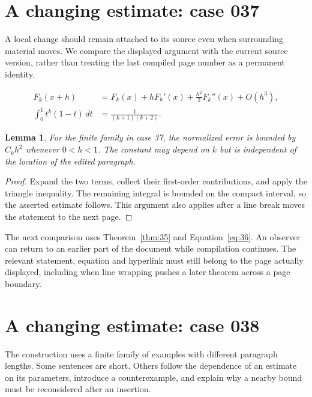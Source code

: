\documentclass[a4paper,10pt]{article}
\newtheorem{lemma}[theorem]{Lemma}
\begin{document}
\lipsum[3]

\section{A changing estimate: case 037}\label{unit:36}
A local change should remain attached to its source even when surrounding material moves. We compare the displayed argument with the current source version, rather than treating the last compiled page number as a permanent identity.

\lipsum[19-20]
\begin{align}\label{eq:36}
 F_k(x+h)&=F_k(x)+hF_k'(x)+\frac{h^2}{2}F_k''(x)+O(h^3),\\
 \int_0^1 t^k(1-t)\,dt&=\frac{1}{(k+1)(k+2)}.
\end{align}
\begin{lemma}\label{thm:36}
For the finite family in case 37, the normalized error is bounded by $C_k h^2$ whenever $0<h<1$. The constant may depend on $k$ but is independent of the location of the edited paragraph.
\end{lemma}
\begin{proof}
Expand the two terms, collect their first-order contributions, and apply the
triangle inequality. The remaining integral is bounded on the compact interval,
so the asserted estimate follows. This argument also applies after a line break
moves the statement to the next page.
\end{proof}
The next comparison uses Theorem~\ref{thm:35} and Equation~\ref{eq:36}. An observer can return to an earlier part of the document while compilation continues. The relevant statement, equation and hyperlink must still belong to the page actually displayed, including when line wrapping pushes a later theorem across a page boundary.

\lipsum[8]

\section{A changing estimate: case 038}\label{unit:37}
The construction uses a finite family of examples with different paragraph lengths. Some sentences are short. Others follow the dependence of an estimate on its parameters, introduce a counterexample, and explain why a nearby bound must be reconsidered after an insertion.
\end{document}
